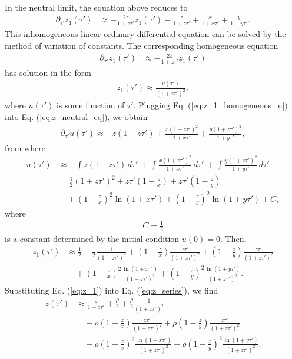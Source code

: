 \documentclass[11pt]{article}
\begin{document}
In the neutral limit, the equation above reduces to
\begin{align}\label{eq:z_neutral_eq}
    \partial_{\tau'}z_1(\tau') &\approx - \frac{2z}{1+z\tau'}z_1(\tau') - \frac{z}{1+z\tau'} + \frac{x}{1+x\tau'} + \frac{y}{1+y\tau'}.
\end{align}
This inhomogeneous linear ordinary differential equation can be solved by the method of variation of constants. The corresponding homogeneous equation 
\begin{align}
    \partial_{\tau'}z_1(\tau') &\approx - \frac{2z}{1+z\tau'}z_1(\tau')
\end{align}
has solution in the form
\begin{align}\label{eq:z_1_homogeneous_u}
    z_1(\tau') \approx \frac{u(\tau')}{(1+z\tau')^2},
\end{align}
where $u(\tau')$ is some function of $\tau'$. Plugging Eq. (\ref{eq:z_1_homogeneous_u}) into Eq. (\ref{eq:z_neutral_eq}), we obtain
\begin{align}
    \partial_{\tau'} u(\tau') \approx - z(1+z\tau') + \frac{x(1+z\tau')^2}{1+x\tau'} + \frac{y(1+z\tau')^2}{1+y\tau'},
\end{align}
from where
\begin{align}
    u(\tau') &\approx - \int z(1+z\tau') \,d\tau'\
    + \int \frac{x(1+z\tau')^2}{1+x\tau'} \,d\tau'\
    + \int \frac{y(1+z\tau')^2}{1+y\tau'} \,d\tau'\, \\\nonumber
    &= \frac{1}{2} (1+z\tau')^2 + z\tau'\left(1 - \frac{z}{x}\right) + z\tau'\left(1 - \frac{z}{y}\right)
     \\\nonumber
    &\quad + \left(1-\frac{z}{x}\right)^2\ln(1+x\tau')
    + \left(1-\frac{z}{y}\right)^2\ln(1+y\tau') + C,
\end{align}
where 
\begin{align}
    C = \frac{1}{2}
\end{align} is a constant determined by the initial condition $u(0)=0$. Then, 
\begin{align}\label{eq:z_1}
    z_1(\tau') &\approx \frac{1}{2} 
    + \frac{1}{2}\frac{1}{(1+z\tau')^2} + \left(1-\frac{z}{x}\right)\frac{z\tau'}{(1+z\tau')^2} + \left(1-\frac{z}{y}\right)\frac{z\tau'}{(1+z\tau')^2}
         \\\nonumber
    &\quad + \left(1-\frac{z}{x}\right)^2 \frac{\ln(1+x\tau')}{(1+z\tau')^2}
    + \left(1-\frac{z}{y}\right)^2 \frac{\ln(1+y\tau')}{(1+z\tau')^2}.
\end{align}
Substituting Eq. (\ref{eq:z_1}) into Eq. (\ref{eq:z_series}), we find
\begin{align}
    z(\tau') &\approx \frac{z}{1+z\tau'} 
    + \frac{\rho}{2}
    + \frac{\rho}{2}\frac{1}{(1+z\tau')^2} 
    \\\nonumber
    &\quad + \rho\left(1-\frac{z}{x}\right)\frac{z\tau'}{(1+z\tau')^2} + \rho\left(1-\frac{z}{y}\right)\frac{z\tau'}{(1+z\tau')^2}
    \\\nonumber
    &\quad + \rho\left(1-\frac{z}{x}\right)^2 \frac{\ln(1+x\tau')}{(1+z\tau')^2}
    + \rho\left(1-\frac{z}{y}\right)^2 \frac{\ln(1+y\tau')}{(1+z\tau')^2}.
\end{align}
\end{document}
